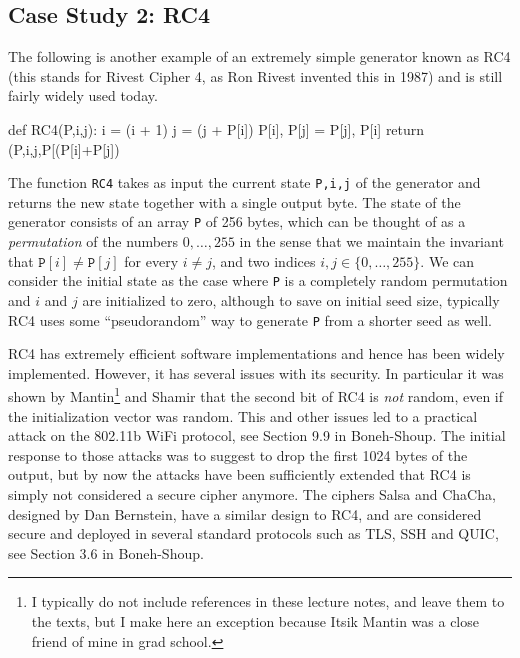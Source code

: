 \subsection{Case Study 2: RC4}\label{3-Case-Study--RC}

The following is another example of an extremely simple generator known
as RC4 (this stands for Rivest Cipher 4, as Ron Rivest invented this in
1987) and is still fairly widely used today.

\begin{code}
def RC4(P,i,j):
    i = (i + 1) %
    j = (j + P[i]) %
    P[i], P[j] = P[j], P[i]
    return (P,i,j,P[(P[i]+P[j]) %
\end{code}

The function \texttt{RC4} takes as input the current state
\texttt{P,i,j} of the generator and returns the new state together with
a single output byte. The state of the generator consists of an array
\texttt{P} of 256 bytes, which can be thought of as a \emph{permutation}
of the numbers \(0,\ldots,255\) in the sense that we maintain the
invariant that \(\texttt{P}[i]\neq\texttt{P}[j]\) for every \(i\neq j\),
and two indices \(i,j \in \{0,\ldots,255\}\). We can consider the
initial state as the case where \texttt{P} is a completely random
permutation and \(i\) and \(j\) are initialized to zero, although to
save on initial seed size, typically RC4 uses some ``pseudorandom'' way
to generate \texttt{P} from a shorter seed as well.

RC4 has extremely efficient software implementations and hence has been
widely implemented. However, it has several issues with its security. In
particular it was shown by Mantin\footnote{I typically do not include
  references in these lecture notes, and leave them to the texts, but I
  make here an exception because Itsik Mantin was a close friend of mine
  in grad school.} and Shamir that the second bit of RC4 is \emph{not}
random, even if the initialization vector was random. This and other
issues led to a practical attack on the 802.11b WiFi protocol, see
Section 9.9 in Boneh-Shoup. The initial response to those attacks was to
suggest to drop the first 1024 bytes of the output, but by now the
attacks have been sufficiently extended that RC4 is simply not
considered a secure cipher anymore. The ciphers Salsa and ChaCha,
designed by Dan Bernstein, have a similar design to RC4, and are
considered secure and deployed in several standard protocols such as
TLS, SSH and QUIC, see Section 3.6 in Boneh-Shoup.

